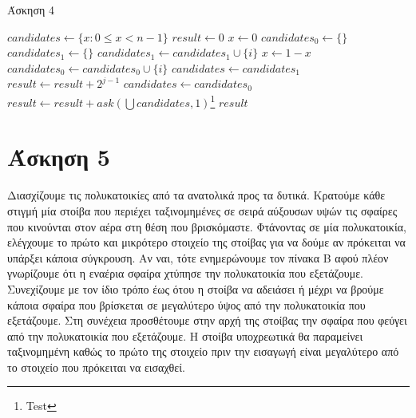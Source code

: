 \documentclass[11pt,a4paper]{book}
\begin{document}
\begin{algorithm}[H]
\caption{\textgreek{Άσκηση 4}}
\begin{algorithmic}[1]
    \State $candidates \gets \{ x: 0 \leq x < n - 1 \}$
    \State $result \gets 0$
        \State $x \gets 0$
        \State $candidates_0 \gets \{\}$
        \State $candidates_1 \gets \{\}$
                \State $candidates_1 \gets candidates_1 \cup \{ i \}$
                \State $x \gets 1 - x$
            \Else
                \State $candidates_0 \gets candidates_0 \cup \{ i \}$
            \EndIf
        \EndFor
            \State $candidates \gets candidates_1$
            \State $result \gets result + 2 ^ {j - 1}$
        \Else
            \State $candidates \gets candidates_0$
        \EndIf
    \EndFor
    \State $result \gets result + ask( \bigcup candidates, 1 )$\footnote{Test}
    \State \Return $result$
\EndProcedure
\end{algorithmic}
\end{algorithm}

\section*{Άσκηση 5}
Διασχίζουμε τις πολυκατοικίες από τα ανατολικά προς τα δυτικά. Κρατούμε κάθε στιγμή μία στοίβα που περιέχει ταξινομημένες σε σειρά αύξουσων υψών τις σφαίρες που κινούνται στον αέρα στη θέση που βρισκόμαστε. Φτάνοντας σε μία πολυκατοικία, ελέγχουμε το πρώτο και μικρότερο στοιχείο της στοίβας για να δούμε αν πρόκειται να υπάρξει κάποια σύγκρουση. Αν ναι, τότε ενημερώνουμε τον πίνακα Β αφού πλέον γνωρίζουμε ότι η εναέρια σφαίρα χτύπησε την πολυκατοικία που εξετάζουμε. Συνεχίζουμε με τον ίδιο τρόπο έως ότου η στοίβα να αδειάσει ή μέχρι να βρούμε κάποια σφαίρα που βρίσκεται σε μεγαλύτερο ύψος από την πολυκατοικία που εξετάζουμε. Στη συνέχεια προσθέτουμε στην αρχή της στοίβας την σφαίρα που φεύγει από την πολυκατοικία που εξετάζουμε. Η στοίβα υποχρεωτικά θα παραμείνει ταξινομημένη καθώς το πρώτο της στοιχείο πριν την εισαγωγή είναι μεγαλύτερο από το στοιχείο που πρόκειται να εισαχθεί.
\end{document}
